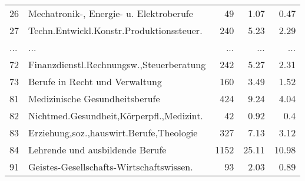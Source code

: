 \begin{longtable}{lXrrr}
        26 & \multicolumn{1}{X}{Mechatronik-, Energie- u. Elektroberufe} & %
          \num{49} &
          \num[round-mode=places,round-precision=2]{1.07} &
          \num[round-mode=places,round-precision=2]{0.47} \\
        27 & \multicolumn{1}{X}{Techn.Entwickl.Konstr.Produktionssteuer.} & %
          \num{240} &
          \num[round-mode=places,round-precision=2]{5.23} &
          \num[round-mode=places,round-precision=2]{2.29} \\
       ... & ... & ... & ... & ... \\
        72 & \multicolumn{1}{X}{Finanzdienstl.Rechnungsw.,Steuerberatung} & %
          \num{242} &
          \num[round-mode=places,round-precision=2]{5.27} &
          \num[round-mode=places,round-precision=2]{2.31} \\

        73 & \multicolumn{1}{X}{Berufe in Recht und Verwaltung} & %
          \num{160} &
          \num[round-mode=places,round-precision=2]{3.49} &
          \num[round-mode=places,round-precision=2]{1.52} \\

        81 & \multicolumn{1}{X}{Medizinische Gesundheitsberufe} & %
          \num{424} &
          \num[round-mode=places,round-precision=2]{9.24} &
          \num[round-mode=places,round-precision=2]{4.04} \\

        82 & \multicolumn{1}{X}{Nichtmed.Gesundheit,Körperpfl.,Medizint.} & %
          \num{42} &
          \num[round-mode=places,round-precision=2]{0.92} &
          \num[round-mode=places,round-precision=2]{0.4} \\

        83 & \multicolumn{1}{X}{Erziehung,soz.,hauswirt.Berufe,Theologie} & %
          \num{327} &
          \num[round-mode=places,round-precision=2]{7.13} &
          \num[round-mode=places,round-precision=2]{3.12} \\

        84 & \multicolumn{1}{X}{Lehrende und ausbildende Berufe} & %
          \num{1152} &
          \num[round-mode=places,round-precision=2]{25.11} &
          \num[round-mode=places,round-precision=2]{10.98} \\

        91 & \multicolumn{1}{X}{Geistes-Gesellschafts-Wirtschaftswissen.} & %
          \num{93} &
          \num[round-mode=places,round-precision=2]{2.03} &
          \num[round-mode=places,round-precision=2]{0.89} \\


\end{longtable}
